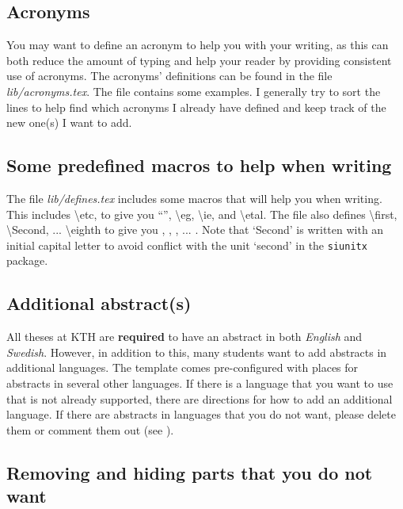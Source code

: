 \documentclass[main.tex]{subfiles}
\begin{document}
\subsection{Acronyms}
\label{sec:addingAcronyms}
You may want to define an acronym to help you with your writing, as this can both reduce the amount of typing and help your reader by providing consistent use of acronyms. The acronyms' definitions can be found in the file \textit{lib/acronyms.tex}. The file contains some examples. I generally try to sort the lines to help find which acronyms I already have defined and keep track of the new one(s) I want to add.

\subsection{Some predefined macros to help when writing}
\label{sec:predefine}

The file \textit{lib/defines.tex} includes some macros that will help you when writing. This includes \textbackslash etc, to give you ``\etc'', \textbackslash eg, \textbackslash ie, and \textbackslash etal.
The file also defines \textbackslash first, \textbackslash Second, ... \textbackslash eighth to give you \first, \Second, \third, ... \eighth. Note that `Second' is written with an initial capital letter to avoid conflict with the unit `second' in the \texttt{siunitx} package.

\subsection{Additional abstract(s)}
\label{sec:additionalAbstracts}

All theses at KTH are \textbf{required} to have an abstract in both \textit{English} and \textit{Swedish}. However, in addition to this, many students want to add abstracts in additional languages. The template comes pre-configured with places for abstracts in several other languages. If there is a language that you want to use that is not already supported, there are directions for how to add an additional language. If there are abstracts in languages that you do not want, please delete them or comment them out (see ).

\subsection{Removing and hiding parts that you do not want}
\label{sec:hideComment}
\end{document}
